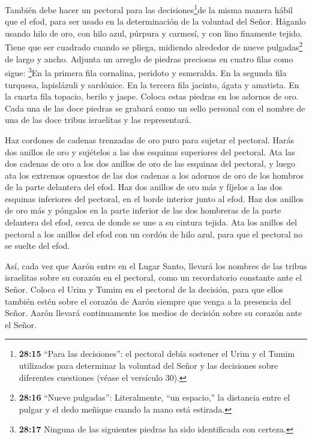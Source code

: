  También debe hacer un pectoral para las
decisiones\footnote{\textbf{28:15} ``Para las decisiones'': el pectoral
  debía sostener el Urim y el Tumim utilizados para determinar la
  voluntad del Señor y las decisiones sobre diferentes cuestiones (véase
  el versículo 30).}de la misma manera hábil que el efod, para ser usado
en la determinación de la voluntad del Señor. Háganlo usando hilo de
oro, con hilo azul, púrpura y carmesí, y con lino finamente tejido.
 Tiene que ser cuadrado cuando se pliega, midiendo
alrededor de nueve pulgadas\footnote{\textbf{28:16} ``Nueve pulgadas'':
  Literalmente, ``un espacio,'' la distancia entre el pulgar y el dedo
  meñique cuando la mano está estirada.} de largo y ancho. 
Adjunta un arreglo de piedras preciosas en cuatro filas como sigue:
\footnote{\textbf{28:17} Ninguna de las siguientes piedras ha sido
  identificada con certeza.}En la primera fila cornalina, peridoto y
esmeralda.  En la segunda fila turquesa, lapislázuli y
sardónice.  En la tercera fila jacinto, ágata y amatista.
 En la cuarta fila topacio, berilo y jaspe. Coloca estas
piedras en los adornos de oro.  Cada una de las doce
piedras se grabará como un sello personal con el nombre de una de las
doce tribus israelitas y las representará.

 Haz cordones de cadenas trenzadas de oro puro para sujetar
el pectoral.  Harás dos anillos de oro y sujételos a las
dos esquinas superiores del pectoral.  Ata las dos cadenas
de oro a los dos anillos de oro de las esquinas del pectoral,
 y luego ata los extremos opuestos de las dos cadenas a los
adornos de oro de los hombros de la parte delantera del efod.
 Haz dos anillos de oro más y fíjelos a las dos esquinas
inferiores del pectoral, en el borde interior junto al efod.
 Haz dos anillos de oro más y póngalos en la parte inferior
de las dos hombreras de la parte delantera del efod, cerca de donde se
une a su cintura tejida.  Ata los anillos del pectoral a
los anillos del efod con un cordón de hilo azul, para que el pectoral no
se suelte del efod.

 Así, cada vez que Aarón entre en el Lugar Santo, llevará
los nombres de las tribus israelitas sobre su corazón en el pectoral,
como un recordatorio constante ante el Señor.  Coloca el
Urim y Tumim en el pectoral de la decisión, para que ellos también estén
sobre el corazón de Aarón siempre que venga a la presencia del Señor.
Aarón llevará continuamente los medios de decisión sobre su corazón ante
el Señor.

